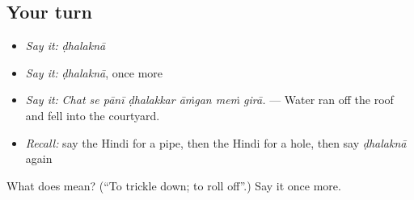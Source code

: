 \subsection*{Your turn}
\begin{itemize}
\raggedright
  \item \emph{Say it:} \emph{ḍhalaknā}
  \item \emph{Say it:} \emph{ḍhalaknā}, once more
  \item \emph{Say it:} \emph{Chat se pānī ḍhalakkar āṁgan meṁ girā.} — Water ran off the roof and fell into the courtyard.
  \item \emph{Recall:} say the Hindi for a pipe, then the Hindi for a hole, then say \emph{ḍhalaknā} again
\end{itemize}

\begin{tcolorbox}[breakable,colback=teal!4,colframe=teal!35!black,title={Before you move on}]
What does  mean? (\textquotedblleft{}To trickle down; to roll off\textquotedblright{}.) Say it once more.
\end{tcolorbox}
